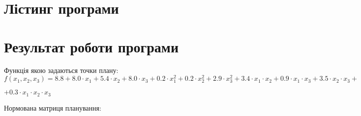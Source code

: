 \section{Лістинг програми}



\newpage

\section{Результат роботи програми}

Функція якою задаються точки плану:
\[f(x_1,x_2,x_3) = 8.8+8.0\cdot x_1+5.4\cdot x_2+8.0\cdot x_3+0.2\cdot x^2_1+0.2\cdot x^2_2+2.9\cdot x^2_3+3.4\cdot x_1\cdot x_2+0.9\cdot x_1\cdot x_3+3.5\cdot x_2\cdot x_3+\]

$+0.3\cdot x_1\cdot x_2 \cdot x_3$

Нормована матриця планування:

